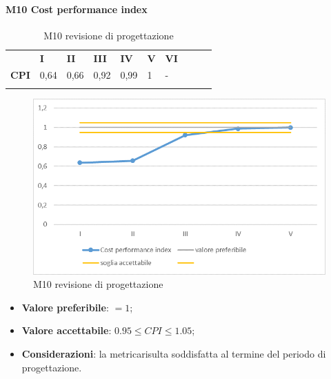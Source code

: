\paragraph{M10 Cost performance index} \mbox{}
\begin{longtable}[H!] {						
		>{}p{50mm}  		
		>{}p{8mm}
		>{}p{8mm}		
		>{}p{8mm}		
		>{}p{8mm}		
		>{}p{8mm}		
		>{}p{8mm}
		>{}p{8mm}
		>{}p{8mm}
		>{}p{8mm}
	}
	\rowcolor{gray!50}
	\textbf{} & \textbf{I} & \textbf{II} & \textbf{III} & \textbf{IV} & \textbf{V} & \textbf{VI} \TBstrut \\ [2mm]
	\textbf{CPI} & 0,64 & 0,66 & 0,92 & 0,99 & 1 & - \TBstrut \\ [2mm]
	\rowcolor{white}
	\caption{M10 revisione di progettazione\glo}
\end{longtable}
\begin{figure}[H] 	
\includegraphics[width=\linewidth]{./img/grafici/RP7.png}	
\caption{M10 revisione di progettazione\glo}	
\end{figure}
\begin{itemize}
	\item \textbf{Valore preferibile}: $=1$;
	\item \textbf{Valore accettabile}: $0.95 \le CPI \le 1.05$;
	\item \textbf{Considerazioni}: la metrica\glosp risulta soddisfatta al termine del periodo di progettazione\glo.
\end{itemize}
